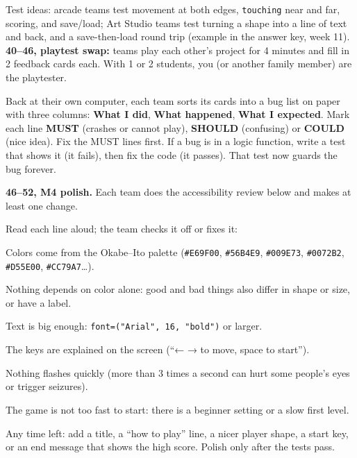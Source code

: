 Test ideas: arcade teams test movement at both edges, \texttt{touching} near and far, scoring, and
save/load; Art Studio teams test turning a shape into a line of text and back, and a save-then-load
round trip (example in the answer key, week 11). \textbf{40--46, playtest swap:} teams play each other's
project for 4 minutes and fill in 2 feedback cards each. With 1 or 2 students, you (or another family
member) are the playtester.

\begin{bughunt}
Back at their own computer, each team sorts its cards into a bug list on paper with three columns:
\textbf{What I did}, \textbf{What happened}, \textbf{What I expected}. Mark each line \textbf{MUST}
(crashes or cannot play), \textbf{SHOULD} (confusing) or \textbf{COULD} (nice idea). Fix the MUST lines
first. If a bug is in a logic function, write a test that shows it (it fails), then fix the code
(it passes). That test now guards the bug forever.
\end{bughunt}

\textbf{46--52, M4 polish.} Each team does the accessibility review below and makes at least one change.

\begin{safety}
Read each line aloud; the team checks it off or fixes it:
\begin{checklist}
  \item Colors come from the Okabe--Ito palette (\texttt{\#E69F00}, \texttt{\#56B4E9}, \texttt{\#009E73}, \texttt{\#0072B2}, \texttt{\#D55E00}, \texttt{\#CC79A7}…).
  \item Nothing depends on color alone: good and bad things also differ in shape or size, or have a label.
  \item Text is big enough: \texttt{font=("Arial", 16, "bold")} or larger.
  \item The keys are explained on the screen (\enquote{← → to move, space to start}).
  \item Nothing flashes quickly (more than 3 times a second can hurt some people's eyes or trigger seizures).
  \item The game is not too fast to start: there is a beginner setting or a slow first level.
\end{checklist}
\end{safety}

\begin{freebuild}
Any time left: add a title, a \enquote{how to play} line, a nicer player shape, a start key, or an
end message that shows the high score. Polish only after the tests pass.
\end{freebuild}

